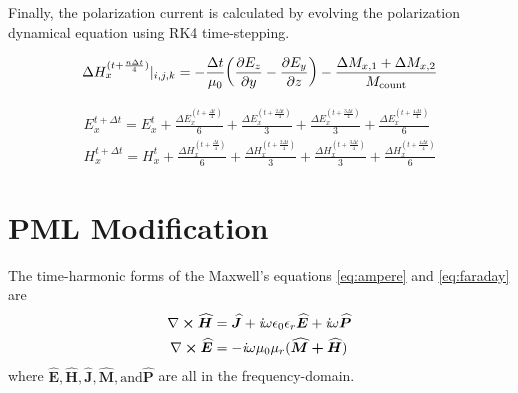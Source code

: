 \documentclass[]{article}
\begin{document}
		Finally, the polarization current is calculated by evolving the polarization dynamical equation using RK4 time-stepping.
	
		\begin{align}
			\Delta H_{x}^{(t+\frac{n\Delta t}{4})}|_{i, j, k} = -\frac{\Delta t}{\mu_{0}}\bigg(\pdv{E_{z}}{y} - \pdv{E_{y}}{z}\bigg) - \frac{\Delta M_{x, 1} + \Delta M_{x, 2}}{M_{\text{count}}}
		\end{align}
		
		\begin{align}
			E_{x}^{t + \Delta t} = E_{x}^{t} + \frac{\Delta E_{x}^{(t+\frac{\Delta t}{4})}}{6} + \frac{\Delta E_{x}^{(t+\frac{2\Delta t}{4})}}{3} + \frac{\Delta E_{x}^{(t+\frac{3\Delta t}{4})}}{3} + \frac{\Delta E_{x}^{(t+\frac{4\Delta t}{4})}}{6} \\
			H_{x}^{t + \Delta t} = H_{x}^{t} + \frac{\Delta H_{x}^{(t+\frac{\Delta t}{4})}}{6} + \frac{\Delta H_{x}^{(t+\frac{2\Delta t}{4})}}{3} + \frac{\Delta H_{x}^{(t+\frac{3\Delta t}{4})}}{3} + \frac{\Delta H_{x}^{(t+\frac{4\Delta t}{4})}}{6}
		\end{align}
		\newpage
		\section*{PML Modification}
		The time-harmonic forms of the Maxwell's equations \eqref{eq:ampere} and \eqref{eq:faraday} are
		\begin{align}
			\nabla\cross\bm{\widehat{H}} &= \bm{\widehat{J}} + \textit{i}\omega\epsilon_{0}\epsilon_{r}\bm{\widehat{E}} + \textit{i}\omega\bm{\widehat{P}} \\
			\nabla\cross\bm{\widehat{E}} &= -\textit{i}\omega\mu_{0}\mu_{r}(\bm{\widehat{M}+\widehat{H}})
		\end{align}
		where $\bm{\widehat{E}}, \bm{\widehat{H}}, \bm{\widehat{J}}, \bm{\widehat{M}}, \text{and} \bm{\widehat{P}}$ are all in the frequency-domain.
		
\end{document}
